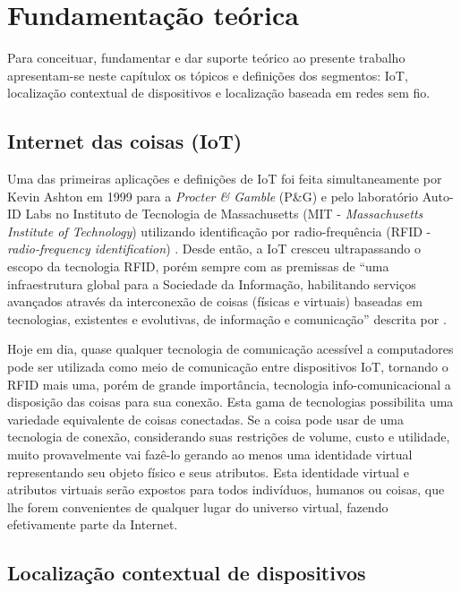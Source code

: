 \chapter{Fundamentação teórica}
\label{chap:Fundamentação teorica}


Para conceituar, fundamentar e dar suporte teórico ao presente trabalho
apresentam-se neste capítulox os tópicos e definições dos segmentos: IoT,
localização contextual de dispositivos e localização baseada em redes sem fio.

\section{Internet das coisas (IoT)}
\label{sec:INTERNET DAS COISAS (IOT)}

Uma das primeiras aplicações e definições de IoT foi feita simultaneamente por Kevin Ashton em
1999 para a \emph{Procter \& Gamble} (P\&G) \cite{ASHTON2009} e
pelo laboratório Auto-ID Labs no Instituto de Tecnologia de
Massachusetts (MIT - \emph{Massachusetts Institute of Technology}) utilizando
identificação por radio-frequência (RFID - \emph{radio-frequency
identification}) \cite{ATZORI2010, Friedemann2011}. Desde então, a IoT cresceu
ultrapassando o escopo da tecnologia RFID, porém sempre com as premissas de ``uma
infraestrutura global para a Sociedade da Informação, habilitando serviços
avançados através da interconexão de coisas (físicas e virtuais) baseadas em
tecnologias, existentes e evolutivas, de informação e comunicação'' descrita por
.

Hoje em dia, quase qualquer tecnologia de comunicação acessível a computadores
pode ser utilizada como meio de comunicação entre dispositivos IoT, tornando
o RFID mais uma, porém de grande importância, tecnologia info-comunicacional a
disposição das coisas para sua conexão. Esta gama de tecnologias possibilita uma
variedade equivalente de coisas conectadas. Se a coisa pode usar de uma
tecnologia de conexão, considerando suas restrições de volume, custo e
utilidade, muito provavelmente vai fazê-lo gerando ao menos uma identidade
virtual representando seu objeto físico e seus atributos. Esta identidade
virtual e atributos virtuais serão expostos para todos indivíduos, humanos ou
coisas, que lhe forem convenientes de qualquer lugar do universo virtual,
fazendo efetivamente parte da Internet.

\section{Localização contextual de dispositivos}
\label{sec:Localização contextual de dispositivos}

